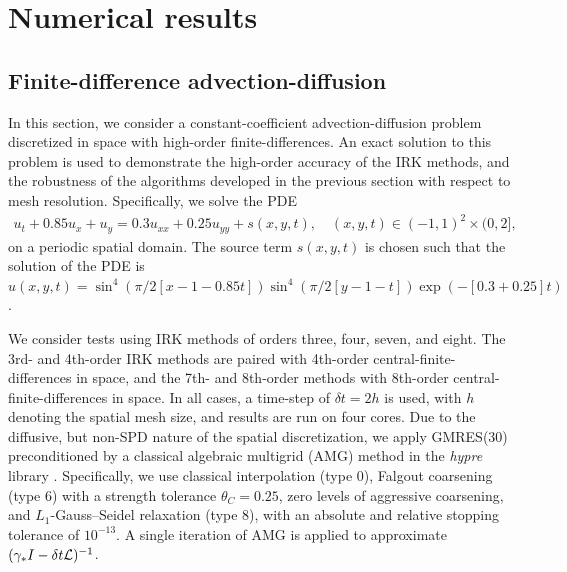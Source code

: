 \documentclass[review]{siamart}
\begin{document}
\section{Numerical results}\label{sec:numerics}

\subsection{Finite-difference advection-diffusion}\label{sec:numerics:fd}

In this section, we consider a constant-coefficient advection-diffusion problem
discretized in space with high-order finite-differences. An exact solution to
this problem is used to demonstrate the high-order accuracy of the IRK methods,
and the robustness of the algorithms developed in the previous section with
respect to mesh resolution. Specifically, we solve the PDE
%
\begin{align}
\label{eq:FD_ex} u_t + 0.85 u_x + u_y = 0.3 u_{xx} + 0.25 u_{yy} + s(x,y,t),
\quad (x,y,t) \in (-1,1)^2 \times (0,2],
\end{align}
%
on a periodic spatial domain. The source term $s(x,y,t)$ is chosen such that
the solution of the PDE is
$u(x,y,t)=\sin^4(\pi/2[x-1-0.85t]) \sin^4(\pi/2 [y-1-t]) \exp(-[0.3+0.25]t)$.

We consider tests using IRK methods of orders three, four, seven, and eight. The
3rd- and 4th-order IRK methods are paired with 4th-order
central-finite-differences in space, and the 7th- and 8th-order methods with
8th-order central-finite-differences in space. In all cases, a time-step of
$\delta t = 2 h$ is used, with $h$ denoting the spatial mesh size, and results
are run on four cores. Due to the
diffusive, but non-SPD nature of the spatial discretization, we apply GMRES(30)
preconditioned by a classical algebraic multigrid (AMG) method in the
\textit{hypre} library \cite{Falgout:2002vu}. Specifically, we
use classical interpolation (type 0), Falgout coarsening (type 6) with a strength
tolerance $\theta_C = 0.25$, zero levels of aggressive coarsening, and
$L_1$-Gauss--Seidel relaxation (type 8), with an absolute and relative stopping
tolerance of $10^{-13}$. A single iteration of AMG is applied to approximate
$(\gamma_* I - \delta t {\cal L})^{-1}$.
\end{document}
